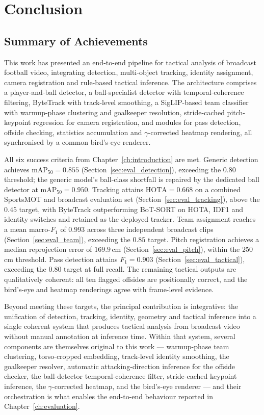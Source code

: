 \chapter{Conclusion}
\label{ch:conclusions}

\section{Summary of Achievements}
\label{sec:summary_achievements}

This work has presented an end-to-end pipeline for tactical analysis of 
broadcast football video, integrating detection, multi-object tracking, 
identity assignment, camera registration and rule-based tactical inference. 
The architecture comprises a player-and-ball detector, a ball-specialist 
detector with temporal-coherence filtering, ByteTrack with track-level 
smoothing, a SigLIP-based team classifier with warmup-phase clustering and 
goalkeeper resolution, stride-cached pitch-keypoint regression for camera registration, and modules 
for pass detection, offside checking, statistics accumulation and \(\gamma\)-corrected 
heatmap rendering, all synchronised by a common bird's-eye renderer.

All six success criteria from Chapter~\ref{ch:introduction} are met.
Generic detection achieves $\mathrm{mAP}_{50} = 0.855$
(Section~\ref{sec:eval_detection}), exceeding the $0.80$ threshold; the
generic model's ball-class shortfall is repaired by the dedicated ball
detector at $\mathrm{mAP}_{50} = 0.950$. Tracking attains
$\mathrm{HOTA} = 0.668$ on a combined SportsMOT and broadcast evaluation set
(Section~\ref{sec:eval_tracking}), above the $0.45$ target, with
ByteTrack outperforming BoT-SORT on HOTA, IDF1 and identity switches
and retained as the deployed tracker. Team assignment reaches a mean
macro-$F_1$ of $0.993$ across three independent broadcast clips
(Section~\ref{sec:eval_team}), exceeding the $0.85$ target. Pitch
registration achieves a median reprojection error of $169.9$\,cm
(Section~\ref{sec:eval_pitch}), within the $250$\,cm threshold. Pass
detection attains $F_1 = 0.903$ (Section~\ref{sec:eval_tactical}),
exceeding the $0.80$ target at full recall. The remaining tactical
outputs are qualitatively coherent: all ten flagged offsides are
positionally correct, and the bird's-eye and heatmap renderings agree
with frame-level evidence.

Beyond meeting these targets, the principal contribution is integrative: 
the unification of detection, tracking, identity, geometry and tactical 
inference into a single coherent system that produces tactical analysis 
from broadcast video without manual annotation at inference time. Within 
that system, several components are themselves original to this work --- 
warmup-phase team clustering, torso-cropped embedding, track-level identity 
smoothing, the goalkeeper resolver, automatic attacking-direction inference 
for the offside checker, the ball-detector temporal-coherence filter, 
stride-cached keypoint inference, the \(\gamma\)-corrected heatmap, and the 
bird's-eye renderer --- and their orchestration is what enables the end-to-end 
behaviour reported in Chapter~\ref{ch:evaluation}.

